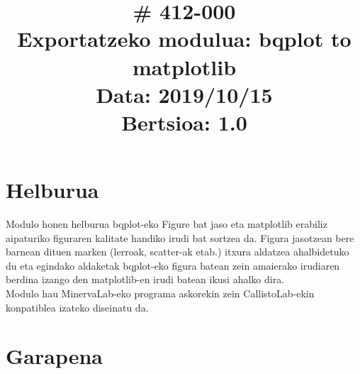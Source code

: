 \documentclass[10pt,a4paper]{article}
\title{\cf \# 412-000 \\ \vspace{5mm}
					Exportatzeko modulua: bqplot to matplotlib\\
\normalsize \vspace{5mm} Data: 2019/10/15 \\
 			\vspace{3mm} Bertsioa: 1.0}
\date{}
\begin{document}
\maketitle
\thispagestyle{fancy}

\section{Helburua}
Modulo honen helburua bqplot-eko Figure bat jaso eta matplotlib erabiliz aipaturiko figuraren kalitate handiko irudi bat sortzea da. Figura jasotzean bere barnean dituen marken (lerroak, scatter-ak etab.) itxura aldatzea ahalbidetuko du eta egindako aldaketak bqplot-eko figura batean zein amaierako irudiaren berdina izango den matplotlib-en irudi batean ikusi ahalko dira.
\\

Modulo hau MinervaLab-eko programa askorekin zein CallistoLab-ekin konpatiblea izateko diseinatu da.

\section{Garapena}
\end{document}
